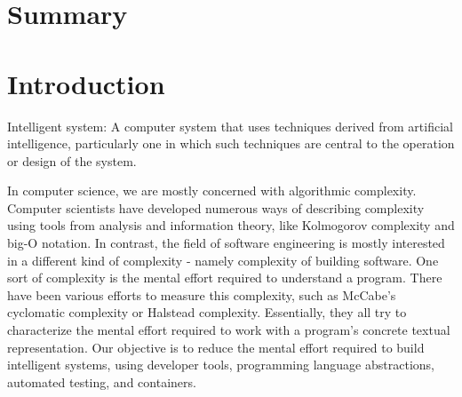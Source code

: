 \documentclass[12pt,initial,twoside,maitrise]{dms}
\numberwithin{equation}{section}
\numberwithin{table}{chapter}
\numberwithin{figure}{chapter}
\begin{document}

\chapter*{Summary}


\anglais
\cleardoublepage
{}  %
\tableofcontents
\cleardoublepage
{}  %
\listoftables
\cleardoublepage
{}
\listoffigures

\NoChapterPageNumber
\cleardoublepage
{}

\chapter{Introduction}

Intelligent system: A computer system that uses techniques derived from artificial intelligence, particularly one in which such techniques are central to the operation or design of the system.

In computer science, we are mostly concerned with algorithmic complexity. Computer scientists have developed numerous ways of describing complexity using tools from analysis and information theory, like Kolmogorov complexity and big-O notation. In contrast, the field of software engineering is mostly interested in a different kind of complexity - namely complexity of building software. One sort of complexity is the mental effort required to understand a program. There have been various efforts to measure this complexity, such as McCabe's cyclomatic complexity or Halstead complexity. Essentially, they all try to characterize the mental effort required to work with a program's concrete textual representation. Our objective is to reduce the mental effort required to build intelligent systems, using developer tools, programming language abstractions, automated testing, and containers.
\end{document}
